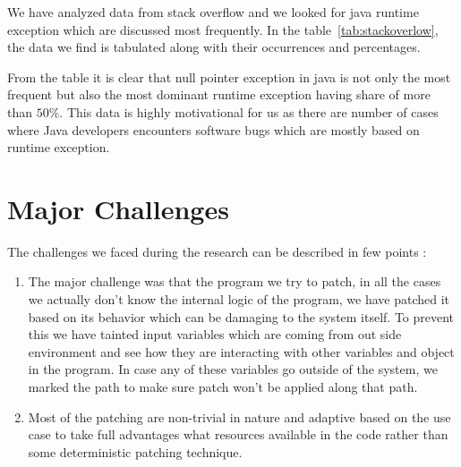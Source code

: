 We have analyzed data from stack overflow and we looked for java runtime
exception which are discussed most frequently. In the
table~\ref{tab:stackoverlow}, the data we find is tabulated along with their
occurrences and percentages.


From the table it is clear that null pointer exception in java is not only the
most frequent but also the most dominant runtime exception having share of more
than $50\%$. This data is highly motivational for us as there are number of
cases where Java developers encounters software bugs which are mostly based on
runtime exception.

\section{Major Challenges}
\label{section:challenges}

The challenges we faced during the research can be described in few points :

\begin{enumerate}
  \item The major challenge was that the program we try to patch, in all the
  cases we actually don't know the internal logic of the program, we have
  patched it based on its behavior which can be damaging to the system itself.
  To prevent this we have tainted input variables which are coming from out side
  environment and see how they are interacting with other variables and object
  in the program. In case any of these variables go outside of the system, we
  marked the path to make sure patch won't be applied along that path.
  
  \item Most of the patching are non-trivial in nature and adaptive based on the
  use case to take full advantages what resources available in the code rather
  than some deterministic patching technique.
\end{enumerate}
